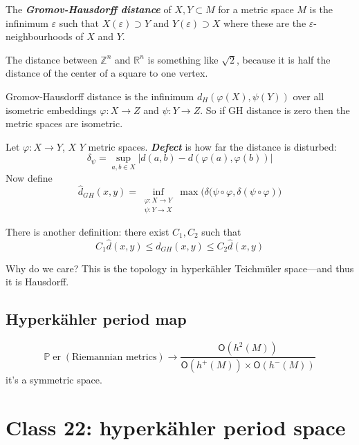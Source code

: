 \begin{defn}\leavevmode
	The \textit{\textbf{Gromov-Hausdorff distance }} of $X,Y \subset M$ for a metric space $M$ is the infinimum $\varepsilon$ such that $X(\varepsilon)\supset Y$ and $Y(\varepsilon) \supset X$ where these are the $\varepsilon$-neighbourhoods of $X$ and $Y$.
\end{defn}

\begin{example}\leavevmode
	The distance between $\mathbb{Z}^n $ and $\mathbb{R}^n$ is something like $\sqrt{2} $, because it is half the distance of the center of a square to one vertex.
\end{example}

\begin{remark}\leavevmode
	Gromov-Hausdorff distance is the infinimum $d_H(\varphi(X),\psi(Y))$ over all isometric embeddings $\varphi:X\to Z$ and $\psi:Y \to Z$. So if GH distance is zero then the metric spaces are isometric.
\end{remark}

\begin{defn}\leavevmode
	Let $\varphi:X\longrightarrow Y$, $X$ $Y$ metric spaces. \textit{\textbf{Defect}} is how far the distance is disturbed:
	\[\delta_\psi=\operatorname{sup}_{a,b \in X}\left| d(a,b)-d(\varphi(a),\varphi(b)) \right| \]
Now define
\[\hat{d}_{GH}(x,y)=\operatorname{inf}_{\substack{\varphi:X\to Y \\ \psi:Y \to X}}\operatorname{max}\Big(\delta(\psi\circ\varphi, \delta(\psi \circ \varphi)\Big)\]
\end{defn}

\begin{remark}\leavevmode
	There is another definition: there exist $C_1,C_2$ such that \[C_1\hat{d}(x,y)\leq  d_{GH}(x,y)\leq C_2\hat{d}(x,y)\] \end{remark}
Why do we care? This is the topology in hyperkähler Teichmüler space---and thus it is Hausdorff.

\subsection{Hyperkähler period map}

\[\mathbb{P}\operatorname{er}(\text{Riemannian metrics} )\longrightarrow \dfrac{\mathsf{O}(h^2(M))}{\mathsf{O}(h^+(M))\times\mathsf{O}(h^-(M))}\]
it's a symmetric space.

\section{Class 22: hyperkähler period space}

